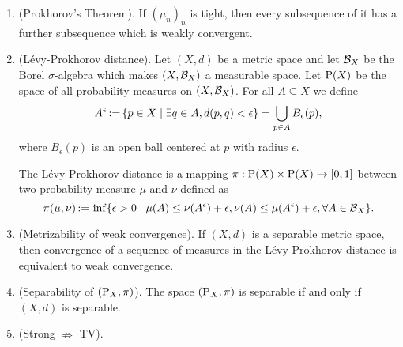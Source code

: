 \documentclass[a4paper,10pt]{article}
\begin{document}
\begin{enumerate}
 \item (Prokhorov's Theorem). If $(\mu_n)_n$ is tight, then every subsequence of it has a further subsequence
       which is weakly convergent. 
       
 \item (L\'{e}vy-Prokhorov distance). Let $(X,d)$ be a metric space and let $\mathcal{B}_X$ be the Borel $\sigma$-algebra
       which makes $(X, \mathcal{B}_X)$ a measurable space. Let $\mathrm{P}(X)$ be the space of all probability measures on 
       $(X, \mathcal{B}_X)$. For all $A\subseteq X$ we define
       \[
        A^\epsilon {}\mathop{\mathrel{:}=}{} \{p \in X {}\mid{} \exists q\in A, d(p,q)<\epsilon\} = \bigcup_{p\in A} B_\epsilon(p),
       \]
       where $B_\epsilon(p)$ is an open ball centered at $p$ with radius $\epsilon$. 
       
       The L\'{e}vy-Prokhorov distance is a mapping $\pi:\mathrm{P}(X)\times \mathrm{P}(X)\to [0,1]$
       between two probability measure $\mu$ and $\nu$ defined as
       \[
        \pi(\mu,\nu) {}\mathop{\mathrel{:}=}{}  \inf\{\epsilon>0 {}\mid{} \mu(A) \leq \nu(A^\epsilon)+\epsilon, \nu(A) \leq \mu(A^\epsilon)+\epsilon, \forall A\in \mathcal{B}_X\}.
       \]

 \item (Metrizability of weak convergence). If $(X, d)$ is a separable metric space, then convergence of a sequence of measures in the 
       L\'{e}vy-Prokhorov distance is equivalent to weak convergence.
       
 \item (Separability of $(\mathrm{P}_X, \pi)$). The space $(\mathrm{P}_X, \pi)$ is separable if and only if $(X,d)$ is separable.
       
 \item (Strong $\nRightarrow$ TV).
\end{enumerate}
\end{document}
